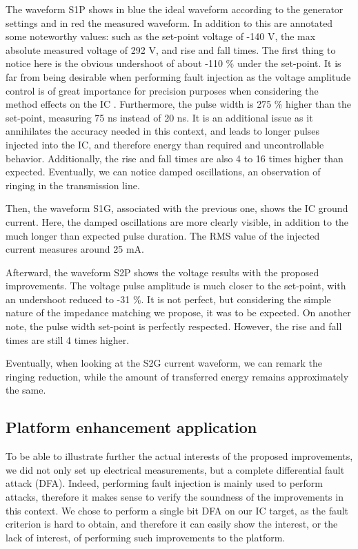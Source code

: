 		The waveform S1P shows in blue the ideal waveform according to the generator settings and in red the measured waveform.
		In addition to this are annotated some noteworthy values: such as the set-point voltage of -140 V, the max absolute measured voltage of 292 V, and rise and fall times.
		The first thing to notice here is the obvious undershoot of about -110 \% under the set-point.
		It is far from being desirable when performing fault injection as the voltage amplitude control is of great importance for precision purposes when considering the method effects on the IC \cite{mybbifdtc2023}.
		Furthermore, the pulse width is 275 \% higher than the set-point, measuring 75 ns instead of 20 ns.
		It is an additional issue as it annihilates the accuracy needed in this context, and leads to longer pulses injected into the IC, and therefore energy than required and uncontrollable behavior.
		Additionally, the rise and fall times are also 4 to 16 times higher than expected.
		Eventually, we can notice damped oscillations, an observation of ringing in the transmission line.

		Then, the waveform S1G, associated with the previous one, shows the IC ground current.
		Here, the damped oscillations are more clearly visible, in addition to the much longer than expected pulse duration.
		The RMS value of the injected current measures around 25 mA.

		Afterward, the waveform S2P shows the voltage results with the proposed improvements.
		The voltage pulse amplitude is much closer to the set-point, with an undershoot reduced to -31 \%.
		It is not perfect, but considering the simple nature of the impedance matching we propose, it was to be expected.
		On another note, the pulse width set-point is perfectly respected.
		However, the rise and fall times are still 4 times higher.
		
		Eventually, when looking at the S2G current waveform, we can remark the ringing reduction, while the amount of transferred energy remains approximately the same.

	\subsection{Platform enhancement application}
		To be able to illustrate further the actual interests of the proposed improvements, we did not only set up electrical measurements, but a complete differential fault attack (DFA).
		Indeed, performing fault injection is mainly used to perform attacks, therefore it makes sense to verify the soundness of the improvements in this context.
		We chose to perform a single bit DFA on our IC target, as the fault criterion is hard to obtain, and therefore it can easily show the interest, or the lack of interest, of performing such improvements to the platform.
		
